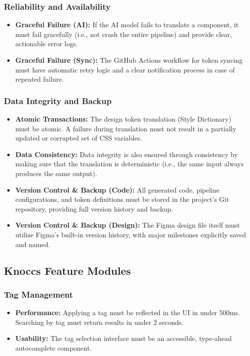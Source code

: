 \subsubsection{Reliability and Availability}
\begin{itemize}
    \item \textbf{Graceful Failure (AI):} If the AI model fails to translate a component, it must fail gracefully (i.e., not crash the entire pipeline) and provide clear, actionable error logs.
    \item \textbf{Graceful Failure (Sync):} The GitHub Actions workflow for token syncing must have automatic retry logic and a clear notification process in case of repeated failure.
\end{itemize}

\subsubsection{Data Integrity and Backup}
\begin{itemize}
    \item \textbf{Atomic Transactions:} The design token translation (Style Dictionary) must be atomic. A failure during translation must not result in a partially updated or corrupted set of CSS variables.
    \item \textbf{Data Consistency:} Data integrity is also ensured through consistency by making sure that the translation is deterministic (i.e., the same input always produces the same output).
    \item \textbf{Version Control \& Backup (Code):} All generated code, pipeline configurations, and token definitions must be stored in the project's Git repository, providing full version history and backup.
    \item \textbf{Version Control \& Backup (Design):} The Figma design file itself must utilize Figma's built-in version history, with major milestones explicitly saved and named.
\end{itemize}

\subsection{Knoccs Feature Modules}

\subsubsection{Tag Management}
\begin{itemize}
    \item \textbf{Performance:} Applying a tag must be reflected in the UI in under 500ms. Searching by tag must return results in under 2 seconds.
    \item \textbf{Usability:} The tag selection interface must be an accessible, type-ahead autocomplete component.
\end{itemize}

